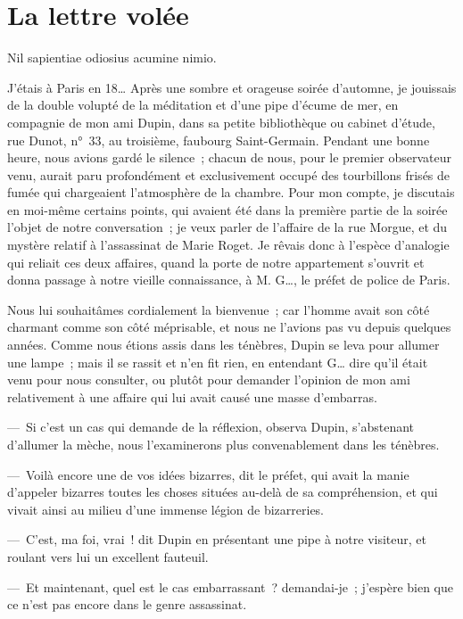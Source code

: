 \documentclass[french,twoside]{book} %
\newcommand{\bibl}[1]{{\RaggedLeft{#1}\par\bigskip}}
\begin{document}
\section[{La lettre volée}]{La lettre volée}\renewcommand{\leftmark}{La lettre volée}

\noindent Nil sapientiae odiosius acumine nimio.\par

\bibl{Sénèque}
\noindent J’étais à Paris en 18… Après une sombre et orageuse soirée d’automne, je jouissais de la double volupté de la méditation et d’une pipe d’écume de mer, en compagnie de mon ami Dupin, dans sa petite bibliothèque ou cabinet d’étude, rue Dunot, n° 33, au troisième, faubourg Saint-Germain. Pendant une bonne heure, nous avions gardé le silence ; chacun de nous, pour le premier observateur venu, aurait paru profondément et exclusivement occupé des tourbillons frisés de fumée qui chargeaient l’atmosphère de la chambre. Pour mon compte, je discutais en moi-même certains points, qui avaient été dans la première partie de la soirée l’objet de notre conversation ; je veux parler de l’affaire de la rue Morgue, et du mystère relatif à l’assassinat de Marie Roget. Je rêvais donc à l’espèce d’analogie qui reliait ces deux affaires, quand la porte de notre appartement s’ouvrit et donna passage à notre vieille connaissance, à M. G…, le préfet de police de Paris.\par
Nous lui souhaitâmes cordialement la bienvenue ; car l’homme avait son côté charmant comme son côté méprisable, et nous ne l’avions pas vu depuis quelques années. Comme nous étions assis dans les ténèbres, Dupin se leva pour allumer une lampe ; mais il se rassit et n’en fit rien, en entendant G… dire qu’il était venu pour nous consulter, ou plutôt pour demander l’opinion de mon ami relativement à une affaire qui lui avait causé une masse d’embarras.\par
— Si c’est un cas qui demande de la réflexion, observa Dupin, s’abstenant d’allumer la mèche, nous l’examinerons plus convenablement dans les ténèbres.\par
— Voilà encore une de vos idées bizarres, dit le préfet, qui avait la manie d’appeler bizarres toutes les choses situées au-delà de sa compréhension, et qui vivait ainsi au milieu d’une immense légion de bizarreries.\par
— C’est, ma foi, vrai ! dit Dupin en présentant une pipe à notre visiteur, et roulant vers lui un excellent fauteuil.\par
— Et maintenant, quel est le cas embarrassant ? demandai-je ; j’espère bien que ce n’est pas encore dans le genre assassinat.\par
\end{document}
